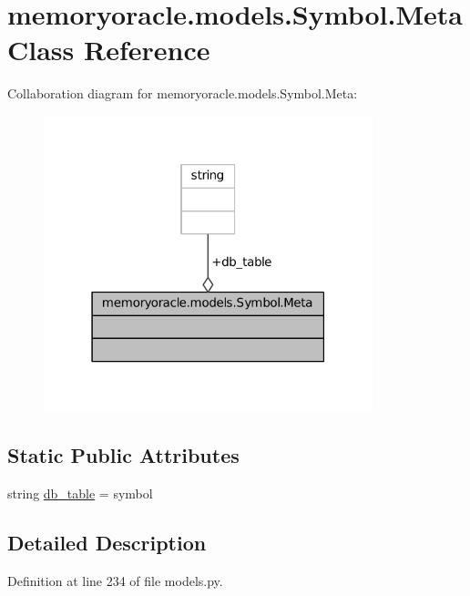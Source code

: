 \hypertarget{classmemoryoracle_1_1models_1_1Symbol_1_1Meta}{}\section{memoryoracle.\+models.\+Symbol.\+Meta Class Reference}
\label{classmemoryoracle_1_1models_1_1Symbol_1_1Meta}


Collaboration diagram for memoryoracle.\+models.\+Symbol.\+Meta\+:\nopagebreak
\begin{figure}[H]
\begin{center}
\leavevmode
\includegraphics[width=271pt]{classmemoryoracle_1_1models_1_1Symbol_1_1Meta__coll__graph}
\end{center}
\end{figure}
\subsection*{Static Public Attributes}
\begin{DoxyCompactItemize}
\item 
string \hyperlink{classmemoryoracle_1_1models_1_1Symbol_1_1Meta_aa24c6d1bcbc301096a6ff2bd119e8ac8}{db\+\_\+table} = \textquotesingle{}symbol\textquotesingle{}
\end{DoxyCompactItemize}


\subsection{Detailed Description}


Definition at line 234 of file models.\+py.



